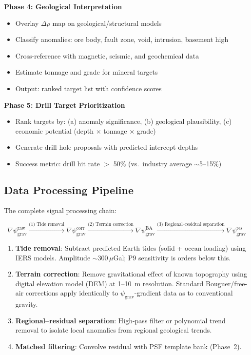 \documentclass[11pt]{article}
\theoremstyle{definition}
\theoremstyle{remark}
\newcommand{\psigrav}{\psi_{\mathrm{grav}}}
\newcommand{\drho}{\Delta\rho}
\begin{document}
\begin{tcolorbox}[colback=green!5!white, colframe=green!40!black,
  title=\textbf{P9 Geological Survey Protocol --- Five Phases}]
\textbf{Phase 4: Geological Interpretation}
\begin{itemize}[nosep]
\item Overlay $\drho$ map on geological/structural models
\item Classify anomalies: ore body, fault zone, void, intrusion, basement high
\item Cross-reference with magnetic, seismic, and geochemical data
\item Estimate tonnage and grade for mineral targets
\item Output: ranked target list with confidence scores
\end{itemize}

\textbf{Phase 5: Drill Target Prioritization}
\begin{itemize}[nosep]
\item Rank targets by: (a) anomaly significance, (b) geological plausibility,
  (c) economic potential (depth $\times$ tonnage $\times$ grade)
\item Generate drill-hole proposals with predicted intercept depths
\item Success metric: drill hit rate $>$ 50\% (vs.\ industry average $\sim$5--15\%)
\end{itemize}
\end{tcolorbox}

\subsection{Data Processing Pipeline}

The complete signal processing chain:

\begin{equation}
\nabla\psigrav^{\mathrm{raw}} \xrightarrow{\text{(1) Tide removal}}
\nabla\psigrav^{\mathrm{corr}} \xrightarrow{\text{(2) Terrain correction}}
\nabla\psigrav^{\mathrm{BA}} \xrightarrow{\text{(3) Regional--residual separation}}
\nabla\psigrav^{\mathrm{res}}
\label{eq:processing-chain}
\end{equation}

\begin{enumerate}
\item \textbf{Tide removal}: Subtract predicted Earth tides (solid + ocean loading)
  using IERS models. Amplitude $\sim 300\,\mu$Gal; P9 sensitivity is orders below this.
\item \textbf{Terrain correction}: Remove gravitational effect of known topography
  using digital elevation model (DEM) at 1--10~m resolution. Standard Bouguer/free-air
  corrections apply identically to $\psigrav$-gradient data as to conventional gravity.
\item \textbf{Regional--residual separation}: High-pass filter or polynomial trend
  removal to isolate local anomalies from regional geological trends.
\item \textbf{Matched filtering}: Convolve residual with PSF template bank (Phase~2).
\end{enumerate}
\end{document}
